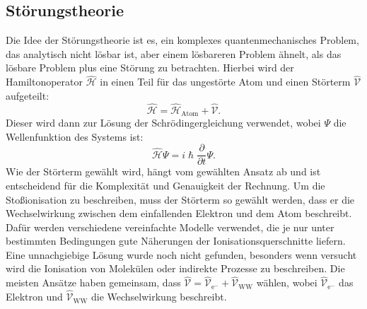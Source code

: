 \subsection{Störungstheorie}
Die Idee der Störungstheorie ist es, ein komplexes quantenmechanisches Problem, das analytisch nicht lösbar ist, aber einem lösbareren Problem ähnelt, als das lösbare Problem plus eine Störung zu betrachten. Hierbei wird der Hamiltonoperator $\hat{\mathcal{H}}$ in einen Teil für das ungestörte Atom und einen Störterm $\hat{\mathcal{V}}$ aufgeteilt:
\begin{equation}
    \hat{\mathcal{H}} = \hat{\mathcal{H}}_\mathrm{Atom} + \hat{\mathcal{V}}.
\end{equation}
Dieser wird dann zur Lösung der Schrödingergleichung verwendet, wobei $\Psi$ die Wellenfunktion des Systems ist:
\begin{equation}
    \hat{\mathcal{H}} \Psi = i\hslash\frac{\partial}{\partial t}\Psi.
\end{equation}
Wie der Störterm gewählt wird, hängt vom gewählten Ansatz ab und ist entscheidend für die Komplexität und Genauigkeit der Rechnung. Um die Stoßionisation zu beschreiben, muss der Störterm so gewählt werden, dass er die Wechselwirkung zwischen dem einfallenden Elektron und dem Atom beschreibt. Dafür werden verschiedene vereinfachte Modelle verwendet, die je nur unter bestimmten Bedingungen gute Näherungen der Ionisationsquerschnitte liefern. Eine unnachgiebige Lösung wurde noch nicht gefunden, besonders wenn versucht wird die Ionisation von Molekülen oder indirekte Prozesse zu beschreiben. Die meisten Ansätze haben gemeinsam, dass $\hat{\mathcal{V}} = \hat{\mathcal{V}}_{\text{e}^-} + \hat{\mathcal{V}}_{\text{WW}}$ wählen, wobei $\hat{\mathcal{V}}_{\text{e}^-}$ das Elektron und $\hat{\mathcal{V}}_{\text{WW}}$ die Wechselwirkung beschreibt.

